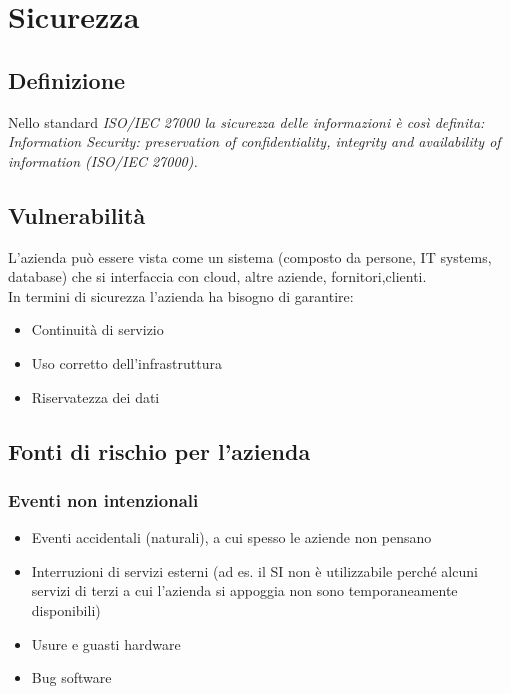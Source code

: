 \chapter{Sicurezza}
\section{Definizione}
Nello standard \it ISO/IEC 27000 \rm la sicurezza delle informazioni \`e cos\`i definita:\\
\it Information Security: preservation of confidentiality, integrity and availability of information (ISO/IEC 27000).\rm

\section{Vulnerabilit\`a}

L'azienda pu\`o essere vista come un sistema (composto da persone, IT
systems, database) che si interfaccia con cloud, altre aziende, fornitori,clienti.\\
In termini di sicurezza l'azienda ha bisogno di garantire:

\begin{itemize}

\item
  Continuit\`a di servizio
\item
  Uso corretto dell'infrastruttura
\item
  Riservatezza dei dati
\end{itemize}
\section{Fonti di rischio per l'azienda}
\subsection{Eventi non intenzionali}

\begin{itemize}

\item
  Eventi accidentali (naturali), a cui spesso le aziende non pensano
\item
  Interruzioni di servizi esterni (ad es. il SI non \`e utilizzabile
  perch\'e alcuni servizi di terzi a cui l'azienda si appoggia non sono
  temporaneamente disponibili)
\item
  Usure e guasti hardware
\item
  Bug software
\end{itemize}

